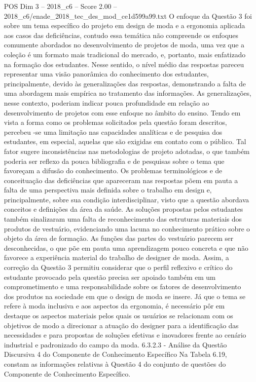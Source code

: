 \begin{textsample}{POS Dim 3 – 2018\_c6 – Score 2.00 – 2018\_c6/enade\_2018\_tec\_des\_mod\_ce1d599a99.txt}
O enfoque da Questão 3 foi sobre um tema específico do projeto em design de moda e a ergonomia aplicada aos casos das deficiências, contudo essa temática não compreende os enfoques comumente abordados no desenvolvimento de projetos de moda, uma vez que a coleção é um formato mais tradicional do mercado, e, portanto, mais enfatizado na formação dos estudantes.
Nesse sentido, o nível médio das respostas pareceu representar uma visão panorâmica do conhecimento dos estudantes, principalmente, devido às generalizações das respostas, demonstrando a falta de uma abordagem mais empírica no tratamento das informações.
As generalizações, nesse contexto, poderiam indicar pouca profundidade em relação ao desenvolvimento de projetos com esse enfoque no âmbito do ensino.
Tendo em vista a forma como os problemas solicitados pela questão foram descritos, percebeu -se uma limitação nas capacidades analíticas e de pesquisa dos estudantes, em especial, aquelas que são exigidas em contato com o público.
Tal fator sugere inconsistências nas metodologias de projeto adotadas, o que também poderia ser reflexo da pouca bibliografia e de pesquisas sobre o tema que favoreçam a difusão do conhecimento.
Os problemas terminológicos e de conceituação das deficiências que apareceram nas respostas põem em pauta a falta de uma perspectiva mais definida sobre o trabalho em design e, principalmente, sobre sua condição interdisciplinar, visto que a questão abordava conceitos e definições da área da saúde.
As soluções propostas pelos estudantes também sinalizaram uma falta de reconhecimento das estruturas materiais dos produtos de vestuário, evidenciando uma lacuna no conhecimento prático sobre o objeto da área de formação.
As funções das partes do vestuário parecem ser desconhecidas, o que põe em pauta uma aprendizagem pouco concreta e que não favorece a experiência material do trabalho de designer de moda.
Assim, a correção da Questão 3 permitiu considerar que o perfil reflexivo e crítico do estudante provocado pela questão precisa ser apoiado também em um comprometimento e uma responsabilidade sobre os fatores de desenvolvimento dos produtos na sociedade em que o design de moda se insere.
Já que o tema se refere à moda inclusiva e aos aspectos da ergonomia, é necessário pôr em destaque os aspectos materiais pelos quais os usuários se relacionam com os objetivos de modo a direcionar a atuação do designer para a identificação das necessidades e para propostas de soluções efetivas e inovadores frente ao cenário industrial e padronizado do campo da moda. 6.3.2.3 - Análise da Questão Discursiva 4 do Componente de Conhecimento Específico Na Tabela 6.19, constam as informações relativas à Questão 4 do conjunto de questões do Componente de Conhecimento Específico.

\end{textsample}
